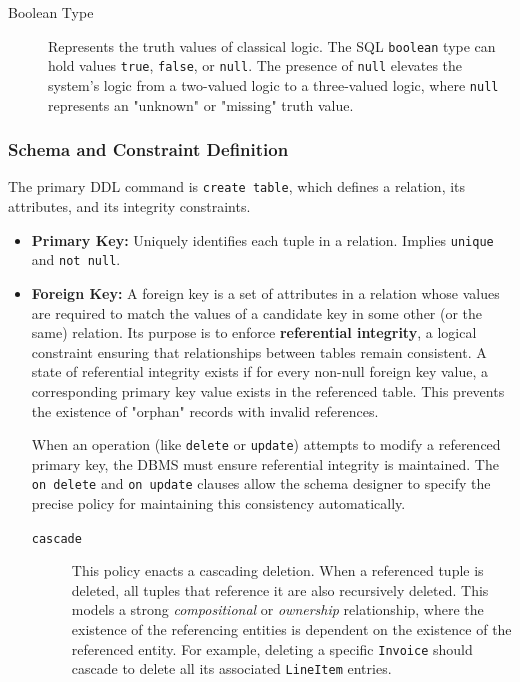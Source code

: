 \begin{description}
    \item[Boolean Type] Represents the truth values of classical logic. The SQL \texttt{boolean} type can hold values \texttt{true}, \texttt{false}, or \texttt{null}. The presence of \texttt{null} elevates the system's logic from a two-valued logic to a three-valued logic, where \texttt{null} represents an "unknown" or "missing" truth value.
\end{description}

\subsubsection{Schema and Constraint Definition}
The primary DDL command is \texttt{create table}, which defines a relation, its attributes, and its integrity constraints.
\begin{itemize}
    \item \textbf{Primary Key:} Uniquely identifies each tuple in a relation. Implies \texttt{unique} and \texttt{not null}.
    \item \textbf{Foreign Key:} A foreign key is a set of attributes in a relation whose values are required to match the values of a candidate key in some other (or the same) relation. Its purpose is to enforce \textbf{referential integrity}, a logical constraint ensuring that relationships between tables remain consistent. A state of referential integrity exists if for every non-null foreign key value, a corresponding primary key value exists in the referenced table. This prevents the existence of "orphan" records with invalid references.

When an operation (like \texttt{delete} or \texttt{update}) attempts to modify a referenced primary key, the DBMS must ensure referential integrity is maintained. The \texttt{on delete} and \texttt{on update} clauses allow the schema designer to specify the precise policy for maintaining this consistency automatically.

\begin{description}
    \item[\texttt{cascade}] This policy enacts a cascading deletion. When a referenced tuple is deleted, all tuples that reference it are also recursively deleted. This models a strong \textit{compositional} or \textit{ownership} relationship, where the existence of the referencing entities is dependent on the existence of the referenced entity. For example, deleting a specific \texttt{Invoice} should cascade to delete all its associated \texttt{LineItem} entries.


\end{description}
\end{itemize}
